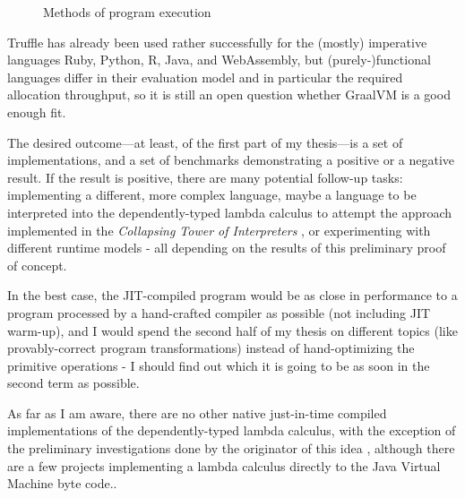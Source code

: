 \documentclass{SPFIT}
\begin{document}
\begin{figure}
\caption{Methods of program execution}
\label{fig:futamora}
\end{figure}

Truffle has already been used rather successfully for the (mostly) imperative
languages Ruby, Python, R, Java, and WebAssembly, but (purely-)functional
languages differ in their evaluation model and in particular the required
allocation throughput, so it is still an open question whether GraalVM is a good
enough fit.

The desired outcome---at least, of the first part of my thesis---is a set of
implementations, and a set of benchmarks demonstrating a positive or a negative
result.  If the result is positive, there are many potential follow-up tasks:
implementing a different, more complex language, maybe a language to be
interpreted into the dependently-typed lambda calculus to attempt the approach
implemented in the \emph{Collapsing Tower of Interpreters} \cite{amin2017collapsing},
or experimenting with different runtime models - all depending on the results of
this preliminary proof of concept.

In the best case, the JIT-compiled program would be as close in performance to a
program processed by a hand-crafted compiler as possible (not including JIT
warm-up), and I would spend the second half of my thesis on different topics
(like provably-correct program transformations) instead of hand-optimizing the
primitive operations - I should find out which it is going to be as soon in the
second term as possible.

As far as I am aware, there are no other native just-in-time compiled
implementations of the dependently-typed lambda calculus, with the exception of
the preliminary investigations done by the originator of this idea
\cite{kmett_2019}, although there are a few projects implementing a lambda
calculus directly to the Java Virtual Machine byte code..
\end{document}
